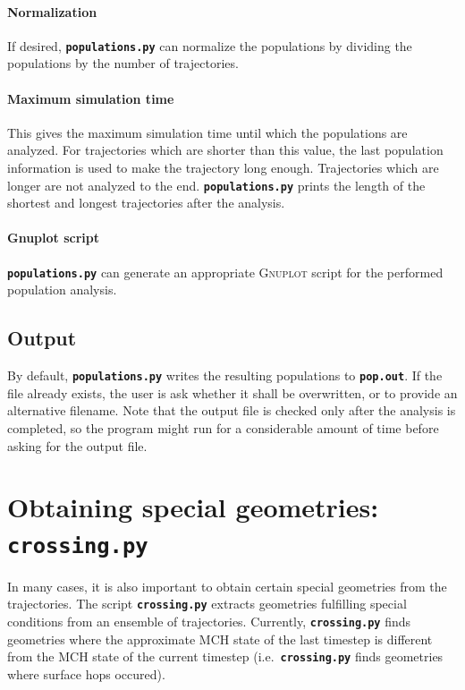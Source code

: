 \documentclass[a4paper,11pt,DIV=15,openany,twoside=false]{scrbook}
\newcommand{\ttt}[1]{\textbf{\texttt{#1}}}
\begin{document}
\paragraph{Normalization}

If desired, \ttt{populations.py} can normalize the populations by dividing the populations by the number of trajectories. 

\paragraph{Maximum simulation time}

This gives the maximum simulation time until which the populations are analyzed. For trajectories which are shorter than this value, the last population information is used to make the trajectory long enough. Trajectories which are longer are not analyzed to the end. \ttt{populations.py} prints the length of the shortest and longest trajectories after the analysis.

\paragraph{Gnuplot script}

\ttt{populations.py} can generate an appropriate \textsc{Gnuplot} script for the performed population analysis. 

\subsection{Output}

By default, \ttt{populations.py} writes the resulting populations to \ttt{pop.out}. If the file already exists, the user is ask whether it shall be overwritten, or to provide an alternative filename. Note that the output file is checked only after the analysis is completed, so the program might run for a considerable amount of time before asking for the output file.


\section{Obtaining special geometries: \ttt{crossing.py}}\label{sec:crossing.py}

In many cases, it is also important to obtain certain special geometries from the trajectories. The script \ttt{crossing.py} extracts geometries fulfilling special conditions from an ensemble of trajectories. Currently, \ttt{crossing.py} finds geometries where the approximate MCH state of the last timestep is different from the MCH state of the current timestep (i.e.\ \ttt{crossing.py} finds geometries where surface hops occured). 
\end{document}
